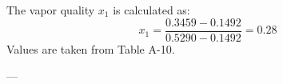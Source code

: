 The vapor quality \( x_1 \) is calculated as:  
\[
x_1 = \frac{0.3459 - 0.1492}{0.5290 - 0.1492} = 0.28
\]  
Values are taken from Table A-10.  

---